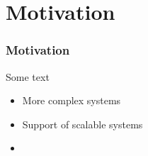 \section{Motivation}
\begin{frame}
  \frametitle{Motivation} 
  Some text
  
  \begin{itemize}
   \item More complex systems \faLongArrowUp
   \item Support of scalable systems \faLongArrowUp
   \item 
  \end{itemize}

\end{frame}
